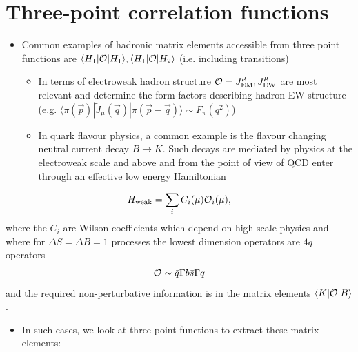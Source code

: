 \section{Three-point correlation functions}
\begin{itemize}
    \item Common examples of hadronic matrix elements accessible from three point functions are $\langle H_1 | {\cal O} | H_1 \rangle, \langle H_1 | {\cal O} | H_2 \rangle$ (i.e. including transitions)
    \begin{itemize}
        \item In terms of electroweak hadron structure ${\cal O} = J^\mu_\text{EM}, J^\mu_\text{EW}$ are most relevant and determine the form factors describing hadron EW structure (e.g. $\langle \pi(\vec{p})|\tilde{J}_\mu(\vec{q})|\pi(\vec{p} - \vec{q})\rangle \sim F_\pi(q^2)$)
        \item In quark flavour physics, a common example is the flavour changing neutral current decay $B \to K$. Such decays are mediated by physics at the electroweak scale and above and from the point of view of QCD enter through an effective low energy Hamiltonian
    \end{itemize}
\end{itemize}
\begin{equation}
    H_\text{weak} = \sum_i C_i(\mu){\cal O}_i(\mu),
\end{equation}
where the $C_i$ are Wilson coefficients which depend on high scale physics and where for $\Delta S = \Delta B = 1$ processes the lowest dimension operators are $4q$ operators
\begin{equation}
    {\cal O} \sim \bar{q} \Gamma b \bar{s} \Gamma q
\end{equation}
and the required non-perturbative information is in the matrix elements $\langle K | {\cal O} | B \rangle$.
\begin{itemize}
    \item In such cases, we look at three-point functions to extract these matrix elements:
\end{itemize}

